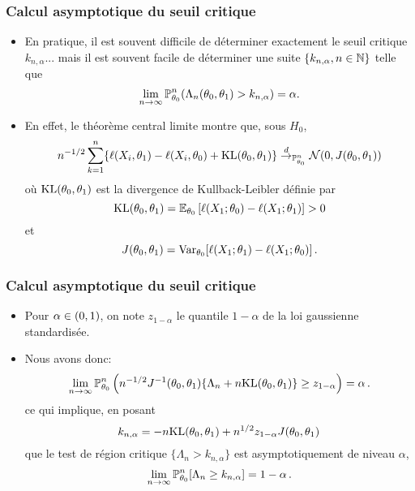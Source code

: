 \begin{frame}
\frametitle{Calcul asymptotique du seuil critique}
\begin{itemize}
\item En pratique, il est souvent difficile de déterminer exactement le seuil critique $k_{n,\alpha}$... mais il est souvent facile de déterminer 
une suite $\{k_{n,\alpha}, n \in \mathbb{N}\}$ telle que 
\[
\lim_{n \to \infty} \operatorname{{\mathbb P}}^n_{\theta_0} ( \Lambda_n(\theta_0,\theta_1) > k_{n,\alpha}) = \alpha.
\]
\item En effet, le théorème central limite montre que, sous $H_0$, 
\[
n^{-1/2} \sum_{k=1}^n \{ \ell(X_i,\theta_1) - \ell(X_i,\theta_0) + \mathrm{KL}(\theta_0,\theta_1) \} \stackrel{d}{\rightarrow}_{\operatorname{{\mathbb P}}^n_{\theta_0}} \mathcal{N}(0,J(\theta_0,\theta_1))
\]
où $\mathrm{KL}(\theta_0,\theta_1)$ est la \alert{divergence de Kullback-Leibler} définie par
\[
\mathrm{KL}(\theta_0,\theta_1) = \operatorname{{\mathbb E}}_{\theta_0}\left[ \ell(X_1;\theta_0) - \ell(X_1;\theta_1) \right] > 0
\]
et 
\[
J(\theta_0,\theta_1)= \operatorname{\mathrm{Var}}_{\theta_0}[ \ell(X_1;\theta_1) - \ell(X_1;\theta_0) ] \,.
\]
\end{itemize}
\end{frame}

\begin{frame}
\frametitle{Calcul asymptotique du seuil critique}
\begin{itemize}
\item Pour $\alpha \in \left(0,1\right)$, on note $z_{1-\alpha}$ le quantile $1-\alpha$ de la loi gaussienne standardisée.
\item  Nous avons donc:
\[
\lim_{n \to \infty} \operatorname{{\mathbb P}}_{\theta_0}^n \left( n^{-1/2} J^{-1}(\theta_0,\theta_1) \{ \Lambda_n + n \mathrm{KL}(\theta_0,\theta_1) \} \geq z_{1-\alpha} \right) = \alpha \,.
\]
ce qui implique, en posant
\[
k_{n,\alpha}= -n \mathrm{KL}(\theta_0,\theta_1) + n^{1/2} z_{1-\alpha} J(\theta_0,\theta_1)
\]
que le test de région critique $\{ \Lambda_n > k_{n,\alpha} \}$ est asymptotiquement de niveau $\alpha$,
\[
\lim_{n \to \infty} \operatorname{{\mathbb P}}^n_{\theta_0} [ \Lambda_n \geq k_{n,\alpha} ]  = 1 - \alpha \,.
\]
\end{itemize}
\end{frame}

